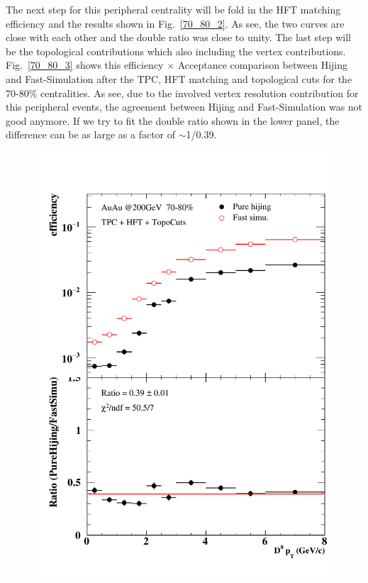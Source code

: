 The next step for this peripheral centrality will be fold in the HFT matching efficiency and the results shown in Fig.~\ref{70_80_2}. As see, the two curves are close with each other and the double ratio was close to unity. The last step will be the topological contributions which also including the vertex contributions. Fig.~\ref{70_80_3} shows this efficiency $\times$ Acceptance comparison between Hijing and Fast-Simulation after the TPC, HFT matching and topological cuts for the 70-80\% centralities. As see, due to the involved vertex resolution contribution for this peripheral events, the agreement between Hijing and Fast-Simulation was not good anymore. If we try to fit the double ratio shown in the lower panel, the difference can be as large as a factor of $\sim$1/0.39.


\begin{figure}[htbp]
\begin{minipage}[htbp]{0.47\linewidth}
\centering
\includegraphics[width=1.0\textwidth,angle=0]{figure/Run14_D0HFT/70_80.pdf}

\end{minipage}
\end{figure}
